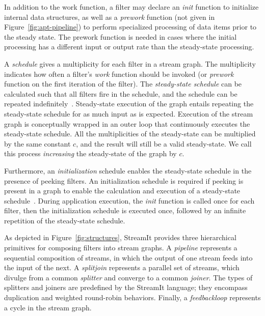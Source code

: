 In addition to the work function, a filter may declare an {\it init}
function to initialize internal data structures, as well as a {\it
  prework} function (not given in Figure~\ref{fig:apt-pipeline}) to
perform specialized processing of data items prior to the steady
state.  The prework function is needed in cases where the initial
processing has a different input or output rate than the steady-state
processing.

A {\it schedule} gives a multiplicity for each filter in a stream
graph.  The multiplicity indicates how often a filter's {\it work} function
should be invoked (or {\it prework} function on the first iteration of the filter).  The
{\it steady-state schedule} can be calculated such that all filters
fire in the schedule, and the schedule can be repeated
indefinitely~\cite{lee87}.  Steady-state execution of the graph
entails repeating the steady-state schedule for as much input as is
expected.  Execution of the stream graph is conceptually wrapped in an
outer loop that continuously executes the steady-state schedule.  All
the multiplicities of the steady-state can be multiplied by the same
constant $c$, and the result will still be a valid steady-state.  We
call this process {\it increasing} the steady-state of the graph by
$c$.

Furthermore, an {\it initialization} schedule enables the steady-state
schedule in the presence of peeking filters.  An initialization
schedule is required if peeking is present in a graph to enable the
calculation and execution of a steady-state
schedule~\cite{karczmarek-lctes03}.  During application execution, the
{\it init} function is called once for each filter, then the
initialization schedule is executed once, followed by an infinite
repetition of the steady-state schedule.

As depicted in Figure~\ref{fig:structures}, StreamIt provides three
hierarchical primitives for composing filters into stream graphs.  A
{\it pipeline} represents a sequential composition of streams, in
which the output of one stream feeds into the input of the next.  A
{\it splitjoin} represents a parallel set of streams, which divulge
from a common {\it splitter} and converge to a common {\it joiner}.
The types of splitters and joiners are predefined by the StreamIt
language; they encompass duplication and weighted round-robin
behaviors.  Finally, a {\it feedbackloop} represents a cycle in the
stream graph.

